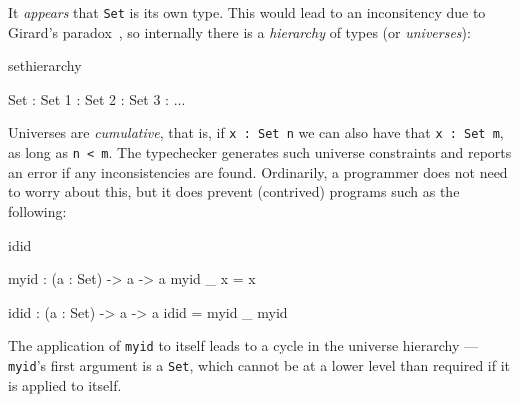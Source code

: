 \noindent
It \emph{appears} that \texttt{Set} is its own type. This would lead to an inconsitency
due to Girard's paradox~\cite{girard-thesis}, so internally there is a \emph{hierarchy}
of types (or \emph{universes}):

\begin{SaveVerbatim}{sethierarchy}

Set : Set 1 : Set 2 : Set 3 : ...

\end{SaveVerbatim}

\noindent
Universes are \emph{cumulative}, that is, if \texttt{x : Set n} we can also have that
\texttt{x : Set m}, as long as \texttt{n < m}. 
The typechecker generates such universe 
constraints and reports an error if any inconsistencies are found. Ordinarily, a
programmer does not need to worry about this, but it does prevent (contrived)
programs such as the following:

\begin{SaveVerbatim}{idid}

myid : (a : Set) -> a -> a
myid _ x = x

idid :  (a : Set) -> a -> a
idid = myid _ myid

\end{SaveVerbatim}

\noindent
The application of \texttt{myid} to itself leads to a cycle in the universe hierarchy
--- \texttt{myid}'s first argument is a \texttt{Set}, which cannot be at a lower level
than required if it is applied to itself.


